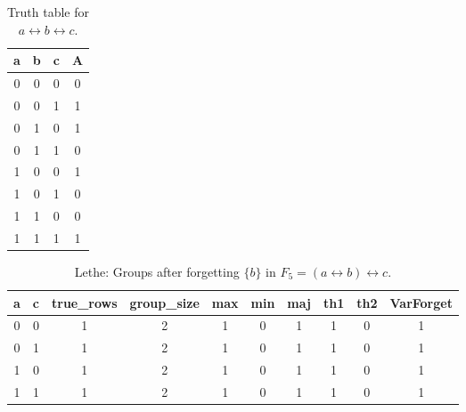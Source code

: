 \begin{table}[!tb]
    \centering
    \begin{tabular}{|c|c|c|c|}
        \hline
        \textbf{a} & \textbf{b} & \textbf{c} & \textbf{A} \\ \hline
        0 & 0 & 0 & 0 \\ \hline
        0 & 0 & 1 & 1 \\ \hline
        0 & 1 & 0 & 1 \\ \hline
        0 & 1 & 1 & 0 \\ \hline
        1 & 0 & 0 & 1 \\ \hline
        1 & 0 & 1 & 0 \\ \hline
        1 & 1 & 0 & 0 \\ \hline
        1 & 1 & 1 & 1 \\ \hline
    \end{tabular}
    \caption{Truth table for $a \leftrightarrow b \leftrightarrow c$.}
    \label{tab:truthtab}
\end{table}

\begin{table}[!tb]
    \centering
    \begin{tabular}{|c|c|c|c|c|c|c|c|c|c|}
        \hline
        \textbf{a} & \textbf{c} & \textbf{true\_rows} & \textbf{group\_size} & \textbf{max} & \textbf{min} & \textbf{maj} & \textbf{th1} & \textbf{th2} & \textbf{VarForget} \\ \hline
        \rowcolor{gray!40} 0 & 0 & 1 & 2 & 1 & 0 & 1 & 1 & 0 & 1 \\ \hline
        \rowcolor{blue!40} 0 & 1 & 1 & 2 & 1 & 0 & 1 & 1 & 0 & 1 \\ \hline
        \rowcolor{red!40} 1 & 0 & 1 & 2 & 1 & 0 & 1 & 1 & 0 & 1 \\ \hline
        \rowcolor{green!40} 1 & 1 & 1 & 2 & 1 & 0 & 1 & 1 & 0 & 1 \\ \hline
    \end{tabular}
    \caption{Lethe: Groups after forgetting $\{b\}$ in $F_{5} = (a \leftrightarrow b) \leftrightarrow c$.}
    \label{tab:lethe-F5-b-groups}
\end{table}
